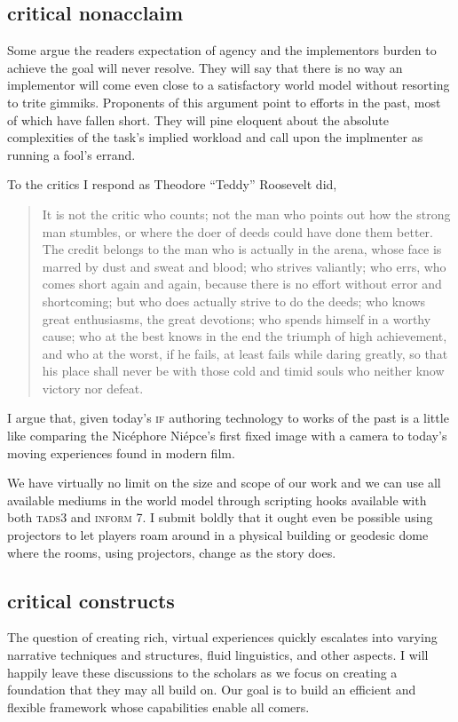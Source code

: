 \subsection{critical non\textendash acclaim}
Some argue the readers expectation of agency and the implementors burden to
achieve the goal will never resolve. They will say that there is no way an
implementor will come even close to a satisfactory world model without resorting
to trite gimmiks. Proponents of this argument point to efforts in the past, most
of which have fallen short. They will pine eloquent about the absolute
complexities of the task's implied workload and call upon the implmenter as
running a fool's errand.

To the critics I respond as Theodore ``Teddy'' Roosevelt did,
\begin{quote}
It is not the critic who counts; not the man who points out how the strong man stumbles, or where the doer of deeds could have done them better. The credit belongs to the man who is actually in the arena, whose face is marred by dust and sweat and blood; who strives valiantly; who errs, who comes short again and again, because there is no effort without error and shortcoming; but who does actually strive to do the deeds; who knows great enthusiasms, the great devotions; who spends himself in a worthy cause; who at the best knows in the end the triumph of high achievement, and who at the worst, if he fails, at least fails while daring greatly, so that his place shall never be with those cold and timid souls who neither know victory nor defeat.
\end{quote}
I argue that, given today's \textsc{if} authoring technology to works of the
past is a little like comparing the Nicéphore Niépce's first fixed image with a
camera to today's moving experiences found in modern film.

We have virtually no limit on the size and scope of our work and we can use all
available mediums in the world model through scripting hooks available with both
\textsc{tads3} and \textsc{inform 7}. I submit boldly that it ought even
be possible using projectors to let players roam around in a physical building
or geodesic dome where the rooms, using projectors, change as the story does.


\subsection{critical constructs}
The question of creating rich, virtual experiences quickly escalates into
varying narrative techniques and structures, fluid linguistics, and other
aspects. I will
happily leave these discussions to the scholars as we focus on creating a
foundation that they may all build on. Our goal is to build an efficient and flexible framework whose capabilities enable all comers. 

